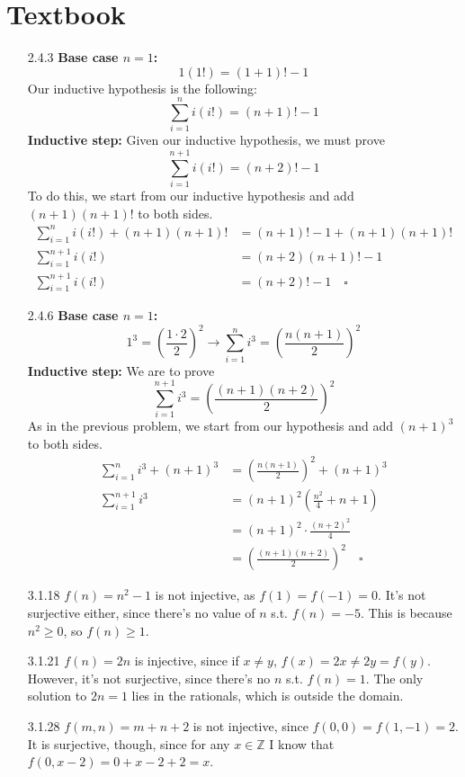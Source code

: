 \documentclass[12pt]{article}
\begin{document}
\section{Textbook}\label{sec:textbook}
\begin{itemize}
    \item[2.4.3] \textbf{Base case $n=1$:} \[1(1!)=(1+1)!-1\]
        Our inductive hypothesis is the following:
        \[\sum_{i=1}^n i(i!) = (n+1)!-1\]
        \textbf{Inductive step:}
        Given our inductive hypothesis, we must prove
        \[\sum_{i=1}^{n+1} i(i!) = (n+2)!-1\]
        To do this, we start from our inductive hypothesis and add $(n+1)(n+1)!$ to both sides.
        \begin{align*}
            \sum_{i=1}^n i(i!) + (n+1)(n+1)! & = (n+1)!-1 + (n+1)(n+1)! \\
            \sum_{i=1}^{n+1} i(i!)           & = (n+2)(n+1)!-1          \\
            \sum_{i=1}^{n+1} i(i!)           & = (n+2)!-1 \quad \square
        \end{align*}
    \item[2.4.6] \textbf{Base case $n=1$:}
        \[1^3=\left(\frac{1 \cdot 2}{2}\right)^2 \rightarrow \sum_{i=1}^n i^3 = \left(\frac{n(n+1)}{2}\right)^2\]
        \textbf{Inductive step:}
        We are to prove
        \[\sum_{i=1}^{n+1} i^3 = \left(\frac{(n+1)(n+2)}{2}\right)^2\]
        As in the previous problem, we start from our hypothesis and add $(n+1)^3$ to both sides.
        \begin{align*}
            \sum_{i=1}^n i^3 + (n+1)^3 & = \left(\frac{n(n+1)}{2}\right)^2 + (n+1)^3         \\
            \sum_{i=1}^{n+1} i^3       & = (n+1)^2\left(\frac{n^2}{4}+{n+1}\right)           \\
                                       & = (n+1)^2 \cdot \frac{(n+2)^2}{4}                   \\
                                       & = \left(\frac{(n+1)(n+2)}{2}\right)^2 \quad \square
        \end{align*}
    \item[3.1.18] $f(n)=n^2-1$ is not injective, as $f(1)=f(-1)=0$.
    It's not surjective either, since there's no value of $n$ s.t. $f(n)=-5$.
    This is because $n^2 \ge 0$, so $f(n) \ge 1$.
    \item[3.1.21] $f(n)=2n$ is injective, since if $x \ne y$, $f(x)=2x \ne 2y =f(y)$.
    However, it's not surjective, since there's no $n$ s.t. $f(n)=1$.
    The only solution to $2n=1$ lies in the rationals, which is outside the domain.
    \item[3.1.28] $f(m,n)=m+n+2$ is not injective, since $f(0,0)=f(1,-1)=2$.
    It is surjective, though, since for any $x \in \mathbb{Z}$ I know that $f(0,x-2)=0+x-2+2=x$.
\end{itemize}
\end{document}

